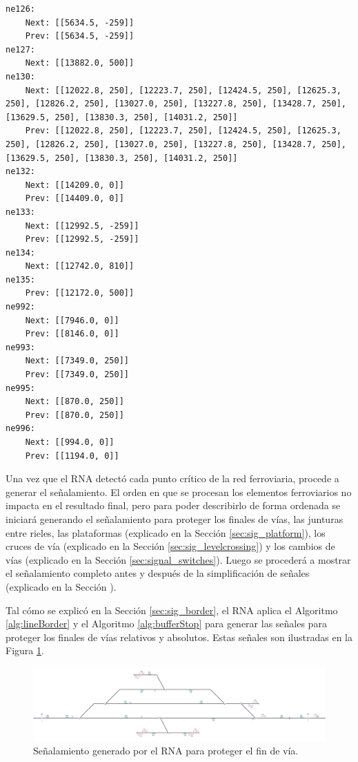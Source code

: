 \begin{lstlisting}[language = {}, tabsize=4, basicstyle=\footnotesize\ttfamily, showspaces=false, showstringspaces=false, caption = SafePoints.RNA, label = {lst:EJ4_5}]
ne126:
	Next: [[5634.5, -259]]
	Prev: [[5634.5, -259]]
ne127:
	Next: [[13882.0, 500]]
ne130:
	Next: [[12022.8, 250], [12223.7, 250], [12424.5, 250], [12625.3, 250], [12826.2, 250], [13027.0, 250], [13227.8, 250], [13428.7, 250], [13629.5, 250], [13830.3, 250], [14031.2, 250]]
	Prev: [[12022.8, 250], [12223.7, 250], [12424.5, 250], [12625.3, 250], [12826.2, 250], [13027.0, 250], [13227.8, 250], [13428.7, 250], [13629.5, 250], [13830.3, 250], [14031.2, 250]]
ne132:
	Next: [[14209.0, 0]]
	Prev: [[14409.0, 0]]
ne133:
	Next: [[12992.5, -259]]
	Prev: [[12992.5, -259]]
ne134:
	Next: [[12742.0, 810]]
ne135:
	Prev: [[12172.0, 500]]
ne992:
	Next: [[7946.0, 0]]
	Prev: [[8146.0, 0]]
ne993:
	Next: [[7349.0, 250]]
	Prev: [[7349.0, 250]]
ne995:
	Next: [[870.0, 250]]
	Prev: [[870.0, 250]]
ne996:
	Next: [[994.0, 0]]
	Prev: [[1194.0, 0]]
	\end{lstlisting}
	
	Una vez que el RNA detectó cada punto crítico de la red ferroviaria, procede a generar el señalamiento. El orden en que se procesan los elementos ferroviarios no impacta en el resultado final, pero para poder describirlo de forma ordenada se iniciará generando el señalamiento para proteger los finales de vías, las junturas entre rieles, las plataformas (explicado en la Sección \ref{sec:sig_platform}), los cruces de vía (explicado en la Sección \ref{sec:sig_levelcrossing}) y los cambios de vías (explicado en la Sección \ref{sec:signal_switches}). Luego se procederá a mostrar el señalamiento completo antes y después de la simplificación de señales (explicado en la Sección \label{sec:simplificacion}). 
	
	Tal cómo se explicó en la Sección \ref{sec:sig_border}, el RNA aplica el Algoritmo \ref{alg:lineBorder} y el Algoritmo \ref{alg:bufferStop} para generar las señales para proteger los finales de vías relativos y absolutos. Estas señales son ilustradas en la Figura \ref{fig:EJ4_3}.
	
	\begin{figure}[H]
		\centering
		\includegraphics[width=1\textwidth]{resultados-obtenidos/ejemplo4/images/4_step1.png}
		\centering\caption{Señalamiento generado por el RNA para proteger el fin de vía.}
		\label{fig:EJ4_3}
	\end{figure}

